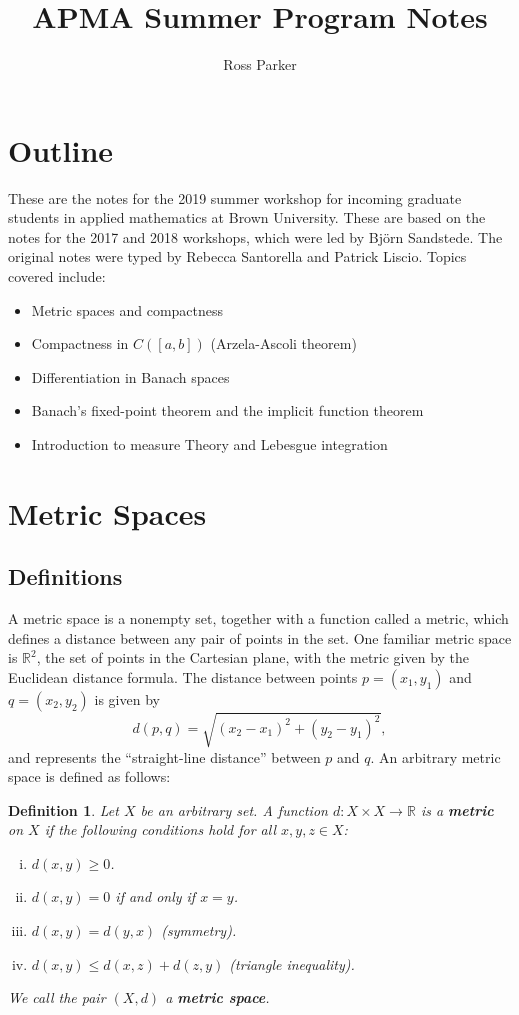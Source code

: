 \documentclass[12pt]{amsart}         %
\title{APMA Summer Program Notes}
\author{Ross Parker}
\newtheorem{definition}{Definition}[section]
\theoremstyle{remark}
\newcommand{\R}{\mathbb{R}}
\begin{document}
\maketitle

\section*{Outline}
\label{sec: introduction}
These are the notes for the 2019 summer workshop for incoming graduate students in applied mathematics at Brown University. These are based on the notes for the 2017 and 2018 workshops, which were led by Bj\"orn Sandstede. The original notes were typed by Rebecca Santorella and Patrick Liscio. Topics covered include:

\begin{itemize}
    \item Metric spaces and compactness
    \item Compactness in $C([a,b])$ (Arzela-Ascoli theorem)
    \item Differentiation in Banach spaces
    \item Banach's fixed-point theorem and the implicit function theorem
    \item Introduction to measure Theory and Lebesgue integration
\end{itemize}

\section{Metric Spaces}
\label{sec: metric_spaces}

\subsection{Definitions}

A metric space is a nonempty set, together with a function called a metric, which defines a distance between any pair of points in the set. One familiar metric space is $\R^2$, the set of points in the Cartesian plane, with the metric given by the Euclidean distance formula. The distance between points $p = (x_1, y_1)$ and $q = (x_2, y_2)$ is given by 
\[
d(p, q) = \sqrt{ (x_2 - x_1)^2 + (y_2 - y_1)^2 },
\]
and represents the ``straight-line distance'' between $p$ and $q$. An arbitrary metric space is defined as follows:

\begin{definition}
Let $X$ be an arbitrary set. A function $d : X \times X \rightarrow \mathbb{R}$ is a \textbf{metric} on $X$ if the following conditions hold for all $x, y, z \in X$:
\begin{enumerate}[(i)]
\item $d(x,y) \geq 0$.
\item $d(x,y) = 0$ if and only if $x = y$.
\item $d(x,y) = d(y,x)$ (symmetry).
\item $d(x,y) \leq d(x,z) + d(z,y)$ (triangle inequality).
\end{enumerate}
We call the pair $(X, d)$ a \textbf{metric space}.
\end{definition}
\end{document}
